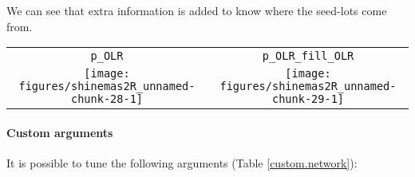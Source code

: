 \documentclass{article}\usepackage[]{graphicx}\usepackage[]{color}
\newenvironment{knitrout}{}{} %
\begin{document}
We can see that extra information is added to know where the seed-lots come from.

\begin{center}
\begin{tabular}{cc}
\texttt{p\_OLR} & \texttt{p\_OLR\_fill\_OLR} \\
\begin{knitrout}
\definecolor{shadecolor}{rgb}{0.969, 0.969, 0.969}\color{fgcolor}

{\centering \texttt{[image: figures/shinemas2R\_unnamed-chunk-28-1]} 

}



\end{knitrout}
&
\begin{knitrout}
\definecolor{shadecolor}{rgb}{0.969, 0.969, 0.969}\color{fgcolor}

{\centering \texttt{[image: figures/shinemas2R\_unnamed-chunk-29-1]} 

}



\end{knitrout}
\\
\end{tabular}
\end{center}



\paragraph{Custom arguments}

It is possible to tune the following arguments (Table \ref{custom.network}):
\end{document}
